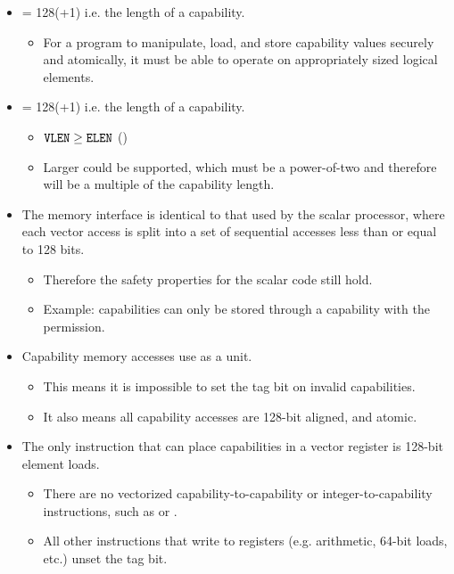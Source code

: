 \begin{itemize}
    \item {} = 128(+1) i.e. the length of a capability.
    \begin{itemize}
        \item For a program to manipulate, load, and store capability values securely and atomically, it must be able to operate on appropriately sized logical elements.
    \end{itemize}
    \item {} = 128(+1) i.e. the length of a capability.
    \begin{itemize}
        \item ${\texttt{VLEN}} \ge {\texttt{ELEN}}$ (\cite[Chapter 2]{specification-RVV-v1.0})
        \item Larger  could be supported, which must be a power-of-two\cite[Chapter 2]{specification-RVV-v1.0} and therefore will be a multiple of the capability length.
    \end{itemize}
    \item The memory interface is identical to that used by the scalar processor, where each vector access is split into a set of sequential accesses less than or equal to 128 bits.
    \begin{itemize}
        \item Therefore the safety properties for the scalar code still hold.
        \item Example: capabilities can only be stored through a capability with the  permission.
    \end{itemize}
    \item Capability memory accesses use  as a unit.
    \begin{itemize}
        \item This means it is impossible to set the tag bit on invalid capabilities.
        \item It also means all capability accesses are 128-bit aligned, and atomic.
    \end{itemize}
    \pagebreak
    \item The only instruction that can place capabilities in a vector register is 128-bit element loads.
    \begin{itemize}
        \item There are no vectorized capability-to-capability or integer-to-capability instructions, such as  or .
        \item All other instructions that write to registers (e.g. arithmetic, 64-bit loads, etc.) unset the tag bit.

\end{itemize}
\end{itemize}
